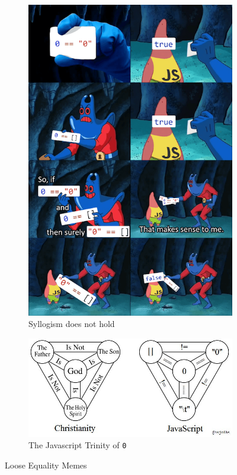 \begin{figure}[htb]\vspace{10pt}\centering
    \begin{subfigure}{.231\textwidth}\centering
        \includegraphics[width=\textwidth]{images/basics-of-javascript/loose-equality-syllogism.png}
        \caption{Syllogism does not hold}
        \label{fig:loose-equality-syllogism}
    \end{subfigure}
    \begin{subfigure}{.729\textwidth}\centering
        \includegraphics[width=\textwidth]{images/basics-of-javascript/loose-equality-trinity.jpg}
        \caption{The Javascript Trinity of \texttt{0}}
        \label{fig:loose-equality-trinity}
    \end{subfigure}
    \caption{Loose Equality Memes}
    \label{fig:loose-equality-memes}
\end{figure}
